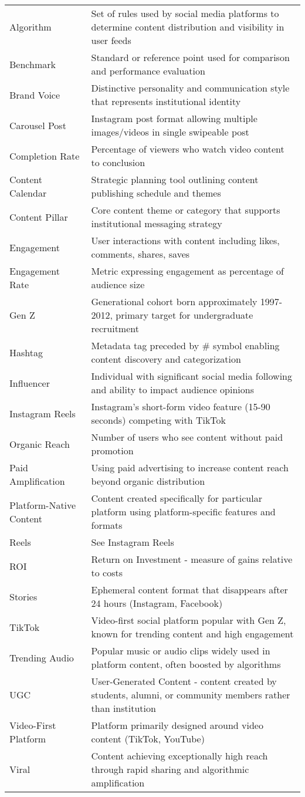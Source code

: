\documentclass[12pt]{report}
\begin{document}
\begin{longtable}{@{}p{3.5cm}p{10cm}@{}}
Algorithm & Set of rules used by social media platforms to determine content distribution and visibility in user feeds \\
Benchmark & Standard or reference point used for comparison and performance evaluation \\
Brand Voice & Distinctive personality and communication style that represents institutional identity \\
Carousel Post & Instagram post format allowing multiple images/videos in single swipeable post \\
Completion Rate & Percentage of viewers who watch video content to conclusion \\
Content Calendar & Strategic planning tool outlining content publishing schedule and themes \\
Content Pillar & Core content theme or category that supports institutional messaging strategy \\
Engagement & User interactions with content including likes, comments, shares, saves \\
Engagement Rate & Metric expressing engagement as percentage of audience size \\
Gen Z & Generational cohort born approximately 1997-2012, primary target for undergraduate recruitment \\
Hashtag & Metadata tag preceded by \# symbol enabling content discovery and categorization \\
Influencer & Individual with significant social media following and ability to impact audience opinions \\
Instagram Reels & Instagram's short-form video feature (15-90 seconds) competing with TikTok \\
Organic Reach & Number of users who see content without paid promotion \\
Paid Amplification & Using paid advertising to increase content reach beyond organic distribution \\
Platform-Native Content & Content created specifically for particular platform using platform-specific features and formats \\
Reels & See Instagram Reels \\
ROI & Return on Investment - measure of gains relative to costs \\
Stories & Ephemeral content format that disappears after 24 hours (Instagram, Facebook) \\
TikTok & Video-first social platform popular with Gen Z, known for trending content and high engagement \\
Trending Audio & Popular music or audio clips widely used in platform content, often boosted by algorithms \\
UGC & User-Generated Content - content created by students, alumni, or community members rather than institution \\
Video-First Platform & Platform primarily designed around video content (TikTok, YouTube) \\
Viral & Content achieving exceptionally high reach through rapid sharing and algorithmic amplification \\
\end{longtable}
\end{document}
